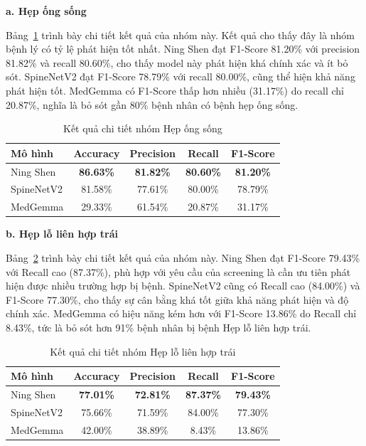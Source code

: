 \textbf{a. Hẹp ống sống}

Bảng~\ref{tab:scs_metrics} trình bày chi tiết kết quả của nhóm này. Kết quả cho thấy đây là nhóm bệnh lý có tỷ lệ phát hiện tốt nhất. Ning Shen đạt F1-Score 81.20\% với precision 81.82\% và recall 80.60\%, cho thấy model này phát hiện khá chính xác và ít bỏ sót. SpineNetV2 đạt F1-Score 78.79\% với recall 80.00\%, cũng thể hiện khả năng phát hiện tốt. MedGemma có F1-Score thấp hơn nhiều (31.17\%) do recall chỉ 20.87\%, nghĩa là bỏ sót gần 80\% bệnh nhân có bệnh hẹp ống sống.

\begin{table}[H]
    \centering
    \caption{Kết quả chi tiết nhóm Hẹp ống sống}
    \label{tab:scs_metrics}
    \renewcommand{\arraystretch}{1.2}
    \begin{tabular}{lcccc}
        \toprule
        \textbf{Mô hình} & \textbf{Accuracy} & \textbf{Precision} & \textbf{Recall} & \textbf{F1-Score} \\
        \midrule
        Ning Shen & \textbf{86.63\%} & \textbf{81.82\%} & \textbf{80.60\%} & \textbf{81.20\%} \\
        SpineNetV2 & 81.58\% & 77.61\% & 80.00\% & 78.79\% \\
        MedGemma & 29.33\% & 61.54\% & 20.87\% & 31.17\% \\
        \bottomrule
    \end{tabular}
\end{table}

\textbf{b. Hẹp lỗ liên hợp trái}

Bảng~\ref{tab:nfn_left_metrics} trình bày chi tiết kết quả của nhóm này. Ning Shen đạt F1-Score 79.43\% với Recall cao (87.37\%), phù hợp với yêu cầu của screening là cần ưu tiên phát hiện được nhiều trường hợp bị bệnh. SpineNetV2 cũng có Recall cao (84.00\%) và F1-Score 77.30\%, cho thấy sự cân bằng khá tốt giữa khả năng phát hiện và độ chính xác. MedGemma có hiệu năng kém hơn với F1-Score 13.86\% do Recall chỉ 8.43\%, tức là bỏ sót hơn 91\% bệnh nhân bị bệnh Hẹp lỗ liên hợp trái.

\begin{table}[H]
    \centering
    \caption{Kết quả chi tiết nhóm Hẹp lỗ liên hợp trái}
    \label{tab:nfn_left_metrics}
    \renewcommand{\arraystretch}{1.2}
    \begin{tabular}{lcccc}
        \toprule
        \textbf{Mô hình} & \textbf{Accuracy} & \textbf{Precision} & \textbf{Recall} & \textbf{F1-Score} \\
        \midrule
        Ning Shen & \textbf{77.01\%} & \textbf{72.81\%} & \textbf{87.37\%} & \textbf{79.43\%} \\
        SpineNetV2 & 75.66\% & 71.59\% & 84.00\% & 77.30\% \\
        MedGemma & 42.00\% & 38.89\% & 8.43\% & 13.86\% \\
        \bottomrule
    \end{tabular}
\end{table}

